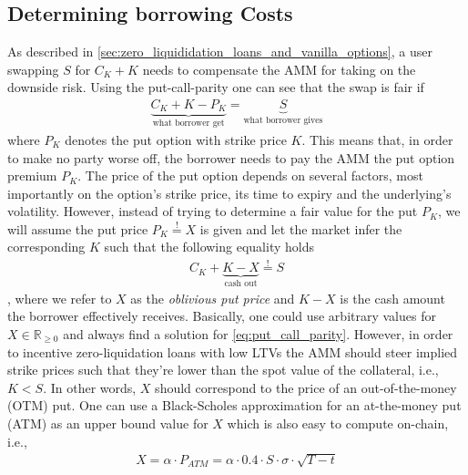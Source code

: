\documentclass[a4paper]{article}
\begin{document}
\subsection{Determining borrowing Costs}
\label{sec:borrowing_costs}
As described in \cref{sec:zero_liquididation_loans_and_vanilla_options}, a user swapping $S$ for $C_K+K$ needs to compensate the AMM for taking on the downside risk. Using the put-call-parity one can see that the swap is fair if
\begin{equation}
\label{eq:put_call_parity}
\begin{split}
\underbrace{C_K+K-P_K}_{\textrm{what borrower get}} = \underbrace{S}_{\textrm{what borrower gives}}
\end{split}
\end{equation}
where $P_K$ denotes the put option with strike price $K$. This means that, in order to make no party worse off, the borrower needs to pay the AMM the put option premium $P_K$. The price of the put option depends on several factors, most importantly on the option's strike price, its time to expiry and the underlying's volatility. However, instead of trying to determine a fair value for the put $P_K$, we will assume the put price $P_K\stackrel{!}{=}X$ is given and let the market infer the corresponding $K$ such that the following equality holds
\begin{equation}
\label{eq:put_call_parity}
\begin{split}
C_K+ \underbrace{K-X}_{\textrm{cash out}} \stackrel{!}{=} S
\end{split}
\end{equation}
, where we refer to $X$ as the \emph{oblivious put price} and $K-X$ is the cash amount the borrower effectively receives. Basically, one could use arbitrary values for $X\in \mathbb R_{\ge 0}$ and always find a solution for \cref{eq:put_call_parity}. However, in order to incentive zero-liquidation loans with low LTVs the AMM should steer implied strike prices such that they're lower than the spot value of the collateral, i.e., $K<S$. In other words, $X$ should correspond to the price of an out-of-the-money (OTM) put. One can use a Black-Scholes approximation for an at-the-money put (ATM) as an upper bound value for $X$ which is also easy to compute on-chain, i.e.,
\begin{equation}
\begin{split}
\label{eq:oblivious_put_price}
X = \alpha \cdot  P_{ATM} = \alpha \cdot 0.4 \cdot  S \cdot \sigma \cdot \sqrt{T-t}
\end{split}
\end{equation}
\end{document}
